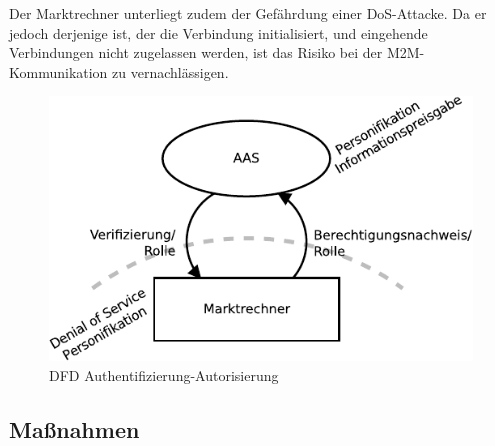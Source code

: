 \documentclass[11pt,a4paper]{report}
\begin{document}
Der Marktrechner unterliegt zudem der Gefährdung einer DoS-Attacke. Da er jedoch derjenige ist, der die Verbindung initialisiert, und eingehende Verbindungen nicht zugelassen werden, ist das Risiko bei der M2M-Kommunikation zu vernachlässigen.

\begin{figure}[htbp]
\centering
\includegraphics[scale=1.1]{images/dfd_auth_threat.pdf}
\caption{DFD Authentifizierung-Autorisierung}
\label{fig:dfd_auth_threat}
\end{figure}

\subsection{Maßnahmen}
\end{document}
